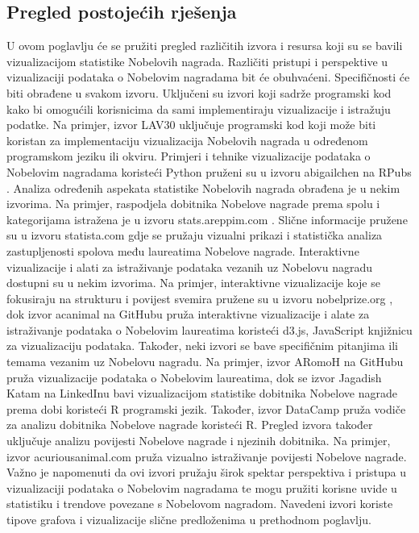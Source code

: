 \documentclass[12pt]{article}
\numberwithin{equation}{section}
\begin{document}
\subsection{Pregled postojećih rješenja}
U ovom poglavlju će se pružiti pregled različitih izvora i resursa koji su se bavili vizualizacijom statistike Nobelovih nagrada. Različiti pristupi i perspektive u vizualizaciji podataka o Nobelovim nagradama bit će obuhvaćeni. Specifičnosti će biti obrađene u svakom izvoru. Uključeni su izvori koji sadrže programski kod kako bi omogućili korisnicima da sami implementiraju vizualizacije i istražuju podatke. Na primjer, izvor LAV30 \cite{LAV30} uključuje programski kod koji može biti koristan za implementaciju vizualizacija Nobelovih nagrada u određenom programskom jeziku ili okviru. Primjeri i tehnike vizualizacije podataka o Nobelovim nagradama koristeći Python pruženi su u izvoru abigailchen na RPubs \cite{abigailchen}. Analiza određenih aspekata statistike Nobelovih nagrada obrađena je u nekim izvorima. Na primjer, raspodjela dobitnika Nobelove nagrade prema spolu i kategorijama istražena je u izvoru stats.areppim.com \cite{stats.areppim}. Slične informacije pružene su u izvoru statista.com \cite{statista} gdje se pružaju vizualni prikazi i statistička analiza zastupljenosti spolova među laureatima Nobelove nagrade. Interaktivne vizualizacije i alati za istraživanje podataka vezanih uz Nobelovu nagradu dostupni su u nekim izvorima. Na primjer, interaktivne vizualizacije koje se fokusiraju na strukturu i povijest svemira pružene su u izvoru nobelprize.org \cite{nobelprize.org}, dok izvor acanimal na GitHubu \cite{acanimal-github} pruža interaktivne vizualizacije i alate za istraživanje podataka o Nobelovim laureatima koristeći d3.js, JavaScript knjižnicu za vizualizaciju podataka. Također, neki izvori se bave specifičnim pitanjima ili temama vezanim uz Nobelovu nagradu. Na primjer, izvor ARomoH na GitHubu \cite{ARomoH} pruža vizualizacije podataka o Nobelovim laureatima, dok se izvor Jagadish Katam na LinkedInu \cite{JagadishKatam} bavi vizualizacijom statistike dobitnika Nobelove nagrade prema dobi koristeći R programski jezik. Također, izvor DataCamp \cite{DataCamp} pruža vodiče za analizu dobitnika Nobelove nagrade koristeći R. Pregled izvora također uključuje analizu povijesti Nobelove nagrade i njezinih dobitnika. Na primjer, izvor acuriousanimal.com \cite{acuriousanimal} pruža vizualno istraživanje povijesti Nobelove nagrade. Važno je napomenuti da ovi izvori pružaju širok spektar perspektiva i pristupa u vizualizaciji podataka o Nobelovim nagradama te mogu pružiti korisne uvide u statistiku i trendove povezane s Nobelovom nagradom. Navedeni izvori koriste tipove grafova i vizualizacije slične predloženima u prethodnom poglavlju.
\end{document}
